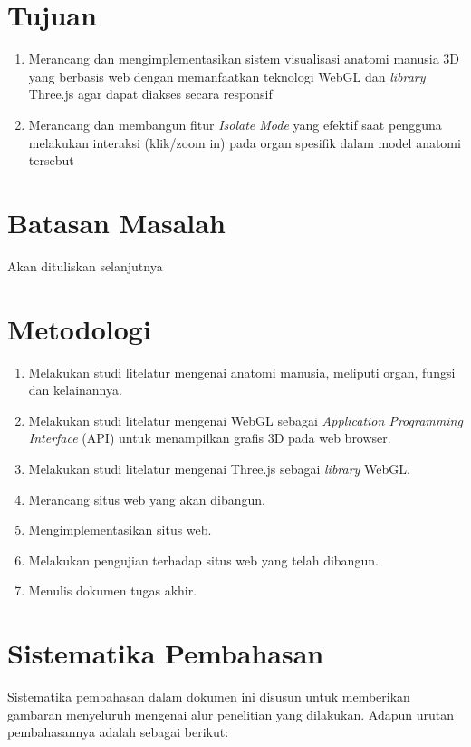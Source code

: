 \section{Tujuan}
\label{sec:tujuan}
    \begin{enumerate}
        \item Merancang dan mengimplementasikan sistem visualisasi anatomi manusia 3D yang berbasis web dengan memanfaatkan teknologi WebGL dan \textit{library} Three.js agar dapat diakses secara responsif
        \item Merancang dan membangun fitur \textit{Isolate Mode} yang efektif saat pengguna melakukan interaksi (klik/zoom in) pada organ spesifik dalam model anatomi tersebut 
    \end{enumerate}

\section{Batasan Masalah}
\label{sec:batasan}
Akan dituliskan selanjutnya

\section{Metodologi}
\label{sec:metlit}
    \begin{enumerate}
		\item Melakukan studi litelatur mengenai anatomi manusia, meliputi organ, fungsi dan kelainannya.
        \item Melakukan studi litelatur mengenai WebGL sebagai \textit{Application Programming Interface} (API) untuk menampilkan grafis 3D pada web browser.
        \item Melakukan studi litelatur mengenai Three.js sebagai \textit{library} WebGL.
        \item Merancang situs web yang akan dibangun.
        \item Mengimplementasikan situs web.
        \item Melakukan pengujian terhadap situs web yang telah dibangun.
		\item Menulis dokumen tugas akhir.
	\end{enumerate}


\section{Sistematika Pembahasan}
\label{sec:sispem}

Sistematika pembahasan dalam dokumen ini disusun untuk memberikan gambaran menyeluruh mengenai alur penelitian yang dilakukan. Adapun urutan pembahasannya adalah sebagai berikut:

